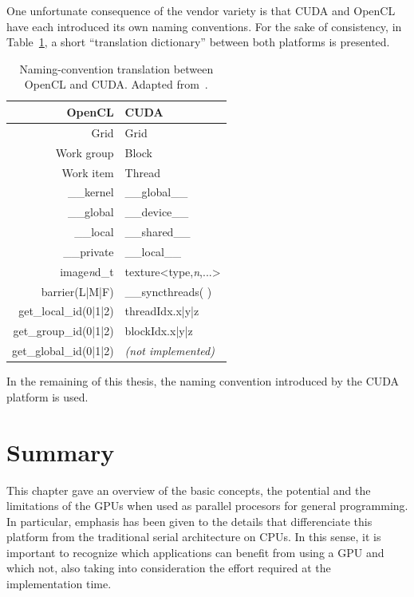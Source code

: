 One unfortunate consequence of the vendor variety is that CUDA and
OpenCL have each introduced its own naming conventions. For the sake
of consistency, in Table~\ref{tab:02-CUDA_OpenCL_translation}, a
short ``translation dictionary'' between both platforms is presented.

\begin{table}
\caption{Naming-convention translation between OpenCL and CUDA. Adapted from~\cite{Kloeckner_CUDA.OpenCL.dictionary:2011}.\label{tab:02-CUDA_OpenCL_translation}}


\centering

\begin{tabular}{r|l}
\hline 
\textbf{OpenCL} & \textbf{CUDA}\tabularnewline[\doublerulesep]
\hline 
Grid & Grid\tabularnewline
Work group & Block\tabularnewline
Work item & Thread\tabularnewline
\_\_kernel & \_\_global\_\_\tabularnewline
\_\_global & \_\_device\_\_\tabularnewline
\_\_local & \_\_shared\_\_\tabularnewline
\_\_private & \_\_local\_\_\tabularnewline
image\emph{n}d\_t & texture<type,\emph{n},...>\tabularnewline
barrier(L|M|F) & \_\_syncthreads( )\tabularnewline
get\_local\_id(0|1|2) & threadIdx.x|y|z\tabularnewline
get\_group\_id(0|1|2) & blockIdx.x|y|z\tabularnewline
get\_global\_id(0|1|2) & \emph{(not implemented)}\tabularnewline
\hline 
\end{tabular}
\end{table}


In the remaining of this thesis, the naming convention introduced
by the CUDA platform is used.


\section{Summary}

This chapter gave an overview of the basic concepts, the potential
and the limitations of the GPUs when used as parallel procesors for
general programming. In particular, emphasis has been given to the
details that differenciate this platform from the traditional serial
architecture on CPUs. In this sense, it is important to recognize
which applications can benefit from using a GPU and which not, also
taking into consideration the effort required at the implementation
time.
